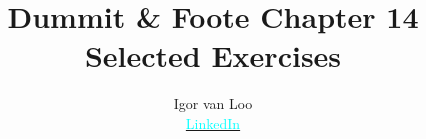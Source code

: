 \renewenvironment{solution}%
{\noindent\textit{Solution. }}{\hfill$\square$\vspace{0.7cm}}

\newtheorem{dummy}{Dummy} %
\newtheorem{dummy2}{Dummy2}
\newtheorem{dummy3}{Dummy3}

\theoremstyle{definition}
\newtheorem{definition}[dummy]{Definition}
\newtheorem{example}[dummy]{Example}
\newtheorem{note}[dummy]{Note}
\newtheorem{axiom}[dummy]{Axiom}
\newtheorem{remark}[dummy]{Remark}
\newtheorem{fact}[dummy]{Fact}
\newtheorem{result}[dummy]{Result}
\newtheorem{algo}[dummy]{Algorithm}

\theoremstyle{plain}
\newtheorem{theorem}[dummy]{Theorem}
\newtheorem{proposition}[dummy]{Proposition}
\newtheorem{corollary}[dummy]{Corollary}

\title{Dummit \& Foote Chapter 14 Selected Exercises}
\author{
    Igor van Loo\\ \href{https://www.linkedin.com/in/igorvanloo/}{\textcolor{cyan}{LinkedIn}} }